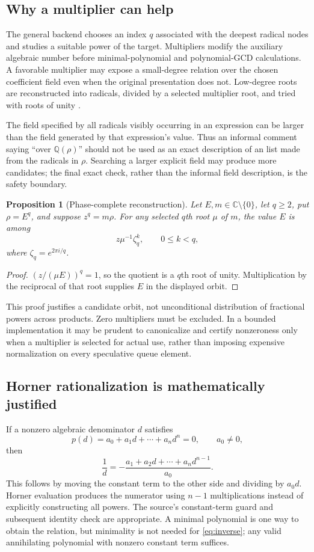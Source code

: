 \documentclass[11pt,letterpaper]{article}
\numberwithin{equation}{section}
\newtheorem{proposition}[theorem]{Proposition}
\theoremstyle{definition}\newtheorem{definition}[theorem]{Definition}
\theoremstyle{remark}\newtheorem{remark}[theorem]{Remark}
\newcommand{\Q}{\mathbb Q}\newcommand{\C}{\mathbb C}\newcommand{\R}{\mathbb R}\newcommand{\Z}{\mathbb Z}
\newcommand{\code}[1]{\texttt{\detokenize{#1}}}
\begin{document}
\subsection{Why a multiplier can help}
The general backend chooses an index $q$ associated with the deepest radical nodes and studies a suitable power of the target. Multipliers modify the auxiliary algebraic number before minimal-polynomial and polynomial-GCD calculations. A favorable multiplier may expose a small-degree relation over the chosen coefficient field even when the original presentation does not. Low-degree roots are reconstructed into radicals, divided by a selected multiplier root, and tried with roots of unity \cite{source}.

The field specified by all radicals visibly occurring in an expression can be larger than the field generated by that expression's value. Thus an informal comment saying ``over $\Q(\rho)$'' should not be used as an exact description of an \code{Extension} list made from the radicals in $\rho$. Searching a larger explicit field may produce more candidates; the final exact check, rather than the informal field description, is the safety boundary.

\begin{proposition}[Phase-complete reconstruction]
Let $E,m\in\C\setminus\{0\}$, let $q\ge2$, put $\rho=E^q$, and suppose $z^q=m\rho$. For any selected $q$th root $\mu$ of $m$, the value $E$ is among
\begin{equation}
z\mu^{-1}\zeta_q^k,\qquad 0\le k<q,
\end{equation}
where $\zeta_q=e^{2\pi i/q}$.
\end{proposition}
\begin{proof}
$(z/(\mu E))^q=1$, so the quotient is a $q$th root of unity. Multiplication by the reciprocal of that root supplies $E$ in the displayed orbit.
\end{proof}
This proof justifies a candidate orbit, not unconditional distribution of fractional powers across products. Zero multipliers must be excluded. In a bounded implementation it may be prudent to canonicalize and certify nonzeroness only when a multiplier is selected for actual use, rather than imposing expensive normalization on every speculative queue element.

\subsection{Horner rationalization is mathematically justified}
If a nonzero algebraic denominator $d$ satisfies
\[
p(d)=a_0+a_1d+\cdots+a_nd^n=0,\qquad a_0\ne0,
\]
then
\begin{equation}
\frac1d=-\frac{a_1+a_2d+\cdots+a_nd^{n-1}}{a_0}.
\label{eq:inverse}
\end{equation}
This follows by moving the constant term to the other side and dividing by $a_0d$. Horner evaluation produces the numerator using $n-1$ multiplications instead of explicitly constructing all powers. The source's constant-term guard and subsequent identity check are appropriate. A minimal polynomial is one way to obtain the relation, but minimality is not needed for \eqref{eq:inverse}; any valid annihilating polynomial with nonzero constant term suffices.
\end{document}
